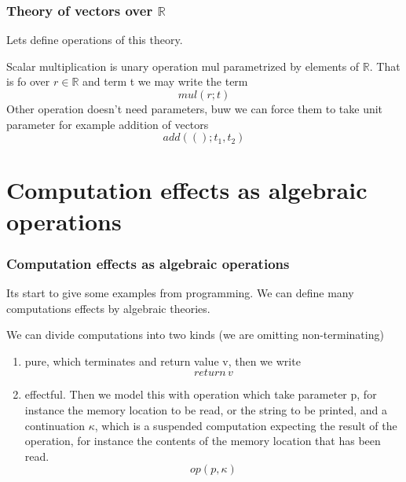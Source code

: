 \documentclass{beamer}
\begin{document}
    \begin{frame}
        \frametitle{Theory of vectors over $\mathbb{R}$}
        Lets define operations of this theory.

        Scalar multiplication is unary operation mul parametrized by elements of $\mathbb{R}$.
        That is fo over $r \in \mathbb{R}$ and term t we may write the term
        \[
          mul(r; t)  
        \]
        Other operation doesn't  need parameters, buw we can force them to take unit parameter
        for example addition of vectors 
        \[
          add((); t_1, t_2)  
        \]
    
        
    
    \end{frame}

 










    






\section{Computation effects as algebraic operations}

\begin{frame}
    \frametitle{Computation effects as algebraic operations}
    Its start to give some examples from programming. We can define many computations effects
    by algebraic theories.


    We can divide computations into two kinds (we are omitting non-terminating)
    \begin{enumerate}
        \item pure, which terminates and return value v, then we write 
        \[
          return \, v  
        \]
        \item effectful. Then we model this with operation which take parameter p, for instance the memory location to be read, or the string
        to be printed, and a continuation $\kappa$, which is a suspended computation expecting the result
        of the operation, for instance the contents of the memory location that has been read.
        \[
          op(p, \kappa)  
        \]
    \end{enumerate}
    
    
    \end{frame}
\end{document}
